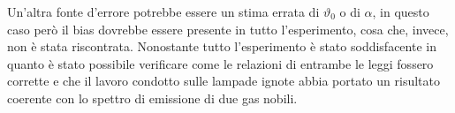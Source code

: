 Un’altra fonte d’errore potrebbe essere un stima errata di $\vartheta_0$ o di $\alpha$, in questo caso però il bias dovrebbe essere presente in tutto l’esperimento, cosa che, invece, non è stata riscontrata. Nonostante tutto l’esperimento è stato soddisfacente in quanto è stato possibile verificare come le relazioni di entrambe le leggi fossero corrette e che il lavoro condotto sulle lampade ignote abbia portato un risultato coerente con lo spettro di emissione di due gas nobili.